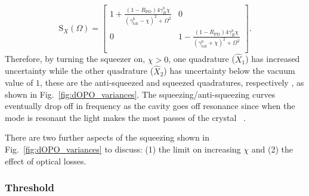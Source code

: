 \begin{equation} \label{eq:dOPO_fixed_phase}
\text{S}_X(\Omega)=\left[
\begin{array}{cc}
 1+\frac{(1-R_\text{PD})4 \gamma^b_R \chi}{\left({\gamma^b_\text{tot}}-\chi\right)^2+\Omega ^2}
 & 0 \\
 0
 & 1-\frac{(1-R_\text{PD})4 \gamma^b_R \chi}{\left({\gamma^b_\text{tot}}+\chi\right)^2+\Omega ^2} \\
\end{array}
\right].
\end{equation}
Therefore, by turning the squeezer on, $\chi>0$, one quadrature ($\hat X_1$) has increased uncertainty while the other quadrature ($\hat X_2$) has uncertainty below the vacuum value of $1$, these are the anti-squeezed and squeezed quadratures, respectively , as shown in Fig.~\ref{fig:dOPO_variances}. The squeezing/anti-squeezing curves eventually drop off in frequency  as the cavity goes off resonance since when the mode is resonant the light makes the most passes of the crystal~\cite{} . %

There are two further aspects of the squeezing shown in Fig.~\ref{fig:dOPO_variances} to discuss: (1) the limit on increasing $\chi$ and (2) the effect of optical losses.

\subsubsection{Threshold}
\label{sec:dOPO_threshold}

